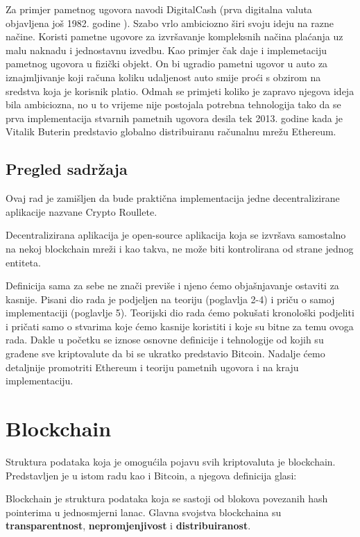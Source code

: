 \documentclass[a4paper,oneside,12pt]{memoir} %
\begin{document}
Za primjer pametnog ugovora navodi DigitalCash (prva digitalna valuta objavljena još 1982. godine \cite{digi_cash}). Szabo vrlo ambiciozno širi svoju ideju na razne načine. Koristi pametne ugovore za izvršavanje kompleksnih načina plaćanja uz malu naknadu i jednostavnu izvedbu. Kao primjer čak daje i implemetaciju pametnog ugovora u fizički objekt. On bi ugradio pametni ugovor u auto za iznajmljivanje koji računa koliku udaljenost auto smije proći s obzirom na sredstva koja je korisnik platio. Odmah se primjeti koliko je zapravo njegova ideja bila ambiciozna, no u to vrijeme nije postojala potrebna tehnologija tako da se prva implementacija stvarnih pametnih ugovora desila tek 2013. godine kada je Vitalik Buterin predstavio globalno distribuiranu računalnu mrežu Ethereum.

\section{Pregled sadržaja}

Ovaj rad je zamišljen da bude praktična implementacija jedne decentralizirane aplikacije nazvane Crypto Roullete.

\begin{definicija}
\label{def:dapp}
Decentralizirana aplikacija je open-source aplikacija koja se izvršava samostalno na nekoj blockchain mreži i kao takva, ne može biti kontrolirana od strane jednog entiteta. 
\end{definicija}

Definicija sama za sebe ne znači previše i njeno ćemo objašnjavanje ostaviti za kasnije. Pisani dio rada je podjeljen na teoriju (poglavlja 2-4) i priču o samoj implementaciji (poglavlje 5). Teorijski dio rada ćemo pokušati kronološki podjeliti i pričati samo o stvarima koje ćemo kasnije koristiti i koje su bitne za temu ovoga rada. Dakle u početku se iznose osnovne definicije i tehnologije od kojih su građene sve kriptovalute da bi se ukratko predstavio Bitcoin. Nadalje ćemo detaljnije promotriti Ethereum i teoriju pametnih ugovora i na kraju implementaciju. 

\chapter{Blockchain}
Struktura podataka koja je omogućila pojavu svih kriptovaluta je blockchain. Predstavljen je u istom radu kao i Bitcoin\cite{bitcoin}, a njegova definicija glasi:

\begin{definicija}
\label{def:block}
Blockchain je struktura podataka koja se sastoji od blokova povezanih hash pointerima u jednosmjerni lanac. Glavna svojstva blockchaina su \textbf{transparentnost}, \textbf{nepromjenjivost} i \textbf{distribuiranost}. 
\end{definicija}
\end{document}
